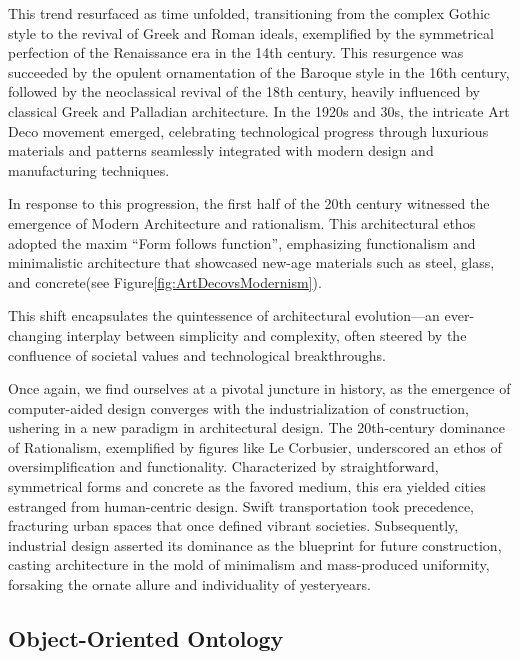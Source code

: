 This trend resurfaced as time unfolded, transitioning from the complex Gothic style to the revival of Greek and Roman ideals, exemplified by the symmetrical perfection of the Renaissance era in the 14th century.
This resurgence was succeeded by the opulent ornamentation of the Baroque style in the 16th century, followed by the neoclassical revival of the 18th century, heavily influenced by classical Greek and Palladian architecture.
In the 1920s and 30s, the intricate Art Deco movement emerged, celebrating technological progress through luxurious materials and patterns seamlessly integrated with modern design and manufacturing techniques.

In response to this progression, the first half of the 20th century witnessed the emergence of Modern Architecture and rationalism.
This architectural ethos adopted the maxim ``Form follows function''\cite{Gage2015}, emphasizing functionalism and minimalistic architecture that showcased new-age materials such as steel, glass, and concrete\cite{Arora2023}(see Figure\ref{fig:ArtDecovsModernism}).


This shift encapsulates the quintessence of architectural evolution—an ever-changing interplay between simplicity and complexity, often steered by the confluence of societal values and technological breakthroughs.


Once again, we find ourselves at a pivotal juncture in history, as the emergence of computer-aided design converges with the industrialization of construction, ushering in a new paradigm in architectural design.
The 20th-century dominance of Rationalism, exemplified by figures like Le Corbusier, underscored an ethos of oversimplification and functionality.
Characterized by straightforward, symmetrical forms and concrete as the favored medium, this era yielded cities estranged from human-centric design.
Swift transportation took precedence, fracturing urban spaces that once defined vibrant societies\cite{Stacbond2020}.
Subsequently, industrial design asserted its dominance as the blueprint for future construction\cite{Economakis2023}, casting architecture in the mold of minimalism and mass-produced uniformity, forsaking the ornate allure and individuality of yesteryears.

\subsection{Object-Oriented Ontology}
\label{subsec:ObjectOrientedOntology}


